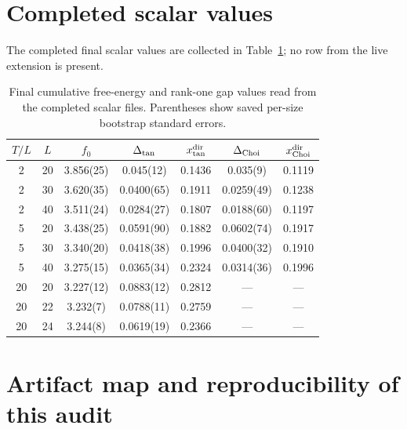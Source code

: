 \documentclass[aps,prb,onecolumn,nofootinbib,superscriptaddress]{revtex4-2}
\begin{document}
\appendix

\section{Completed scalar values}

The completed final scalar values are collected in Table~\ref{tab:rawscalars}; no row from
the live extension is present.

\begin{table}[h]
\caption{Final cumulative free-energy and rank-one gap values read from the completed scalar
files.  Parentheses show saved per-size bootstrap standard errors.}
\label{tab:rawscalars}
\begin{ruledtabular}
\begin{tabular}{ccccccc}
$T/L$ & $L$ & $f_0$ & $\Delta_{\rm tan}$ & $x_{\rm tan}^{\rm dir}$ & $\Delta_{\rm Choi}$ & $x_{\rm Choi}^{\rm dir}$ \\
\hline
2 &20&3.856(25)&0.045(12)&0.1436&0.035(9)&0.1119\\
2 &30&3.620(35)&0.0400(65)&0.1911&0.0259(49)&0.1238\\
2 &40&3.511(24)&0.0284(27)&0.1807&0.0188(60)&0.1197\\
5 &20&3.438(25)&0.0591(90)&0.1882&0.0602(74)&0.1917\\
5 &30&3.340(20)&0.0418(38)&0.1996&0.0400(32)&0.1910\\
5 &40&3.275(15)&0.0365(34)&0.2324&0.0314(36)&0.1996\\
20&20&3.227(12)&0.0883(12)&0.2812&---&---\\
20&22&3.232(7)&0.0788(11)&0.2759&---&---\\
20&24&3.244(8)&0.0619(19)&0.2366&---&---\\
\end{tabular}
\end{ruledtabular}
\end{table}

\clearpage

\section{Artifact map and reproducibility of this audit}
\end{document}
